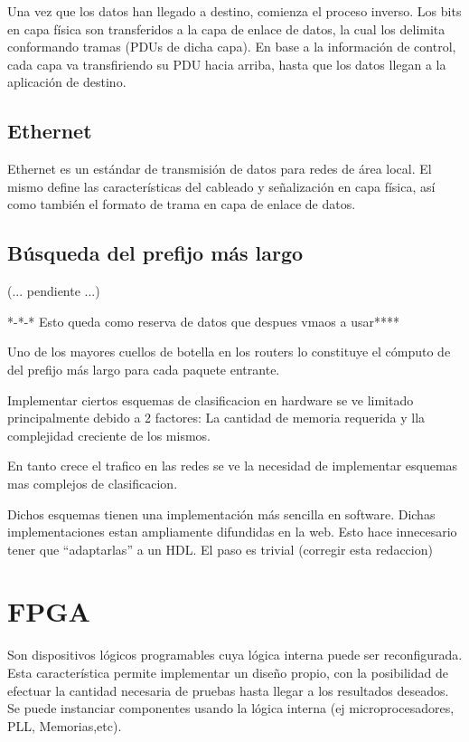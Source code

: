 Una vez que los datos han llegado a destino, comienza el proceso inverso. Los bits en capa física son transferidos a la capa de enlace de datos, la cual los delimita conformando tramas (PDUs de dicha capa). En base a la información de control, cada capa va transfiriendo su PDU hacia arriba, hasta que los datos llegan a la aplicación de destino.

\subsection{Ethernet}

Ethernet es un estándar de transmisión de datos para redes de área local. El mismo define las características del cableado y señalización en capa física, así como también el formato de trama en capa de enlace de datos.



\subsection{Búsqueda del prefijo más largo}

(... pendiente ...)


*-*-* Esto queda como reserva de datos que despues vmaos a usar****

Uno de los mayores cuellos de botella en los routers lo constituye el cómputo de del prefijo más largo para cada paquete entrante.

Implementar ciertos esquemas de clasificacion en hardware se ve limitado principalmente debido a 2 factores: La cantidad de memoria requerida y lla complejidad creciente de los mismos.

En tanto crece el trafico en las redes se ve la necesidad de implementar esquemas mas complejos de clasificacion.

Dichos esquemas tienen una implementación más sencilla en software. Dichas implementaciones estan ampliamente difundidas en la web.
Esto hace innecesario tener que “adaptarlas” a un HDL. El paso es trivial (corregir esta redaccion)

\section{FPGA}
Son dispositivos lógicos programables cuya lógica interna puede ser reconfigurada. Esta característica permite implementar un diseño propio, con la posibilidad de efectuar la cantidad necesaria de pruebas hasta llegar a los resultados deseados. Se puede instanciar componentes usando la lógica interna (ej microprocesadores, PLL, Memorias,etc).

